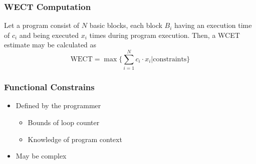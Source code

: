 \subsubsection{WECT Computation}
Let a program consist of $N$ basic blocks, each block $B_i$ having an execution time of $c_i$ and being executed $x_i$ times during program execution. Then, a WCET estimate may be calculated as
$$
	\text{WECT} = \max\{\sum_{i=1}^Nc_i\cdot x_i|\text{constraints}\}
$$

\subsubsection{Functional Constrains}
\begin{itemize}
	\item Defined by the programmer
\begin{itemize}
	\item Bounds of loop counter
	\item Knowledge of program context
\end{itemize}
	\item May be complex
\end{itemize}































